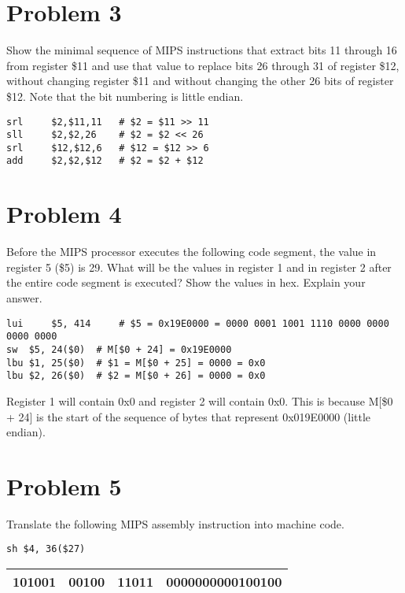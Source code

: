 \documentclass[10pt,letterpaper]{article}
\begin{document}

\section{Problem 3}
Show the minimal sequence of MIPS instructions that extract bits 11 through 16 from register \$11 and use that value to replace bits 26 through 31 of register \$12, without changing register \$11 and
without changing the other 26 bits of register \$12. Note that the bit numbering is little endian.
\begin{lstlisting}
srl 	$2,$11,11 	# $2 = $11 >> 11
sll 	$2,$2,26 	# $2 = $2 << 26
srl 	$12,$12,6 	# $12 = $12 >> 6
add 	$2,$2,$12 	# $2 = $2 + $12
\end{lstlisting}
\pagebreak


\section{Problem 4}
Before the MIPS processor executes the following code segment, the value in register 5 (\$5) is 29. What will be the values in register 1 and in register 2 after the entire code segment is executed? Show the values in hex. Explain your answer.
\begin{lstlisting}
lui 	$5, 414		# $5 = 0x19E0000 = 0000 0001 1001 1110 0000 0000 0000 0000
sw 	$5, 24($0)	# M[$0 + 24] = 0x19E0000
lbu	$1, 25($0) 	# $1 = M[$0 + 25] = 0000 = 0x0
lbu	$2, 26($0) 	# $2 = M[$0 + 26] = 0000 = 0x0
\end{lstlisting}
Register 1 will contain 0x0 and register 2 will contain 0x0. This is because M[\$0 + 24] is the start of the sequence of bytes that represent 0x019E0000 (little endian). 
\pagebreak


\section{Problem 5}
Translate the following MIPS assembly instruction into machine code.
\begin{lstlisting}
sh $4, 36($27)
\end{lstlisting}
\begin{tabular} { |c|c|c|c|}
\hline
101001&00100&11011&0000000000100100\\
\hline
\end{tabular}
\pagebreak

\end{document}
